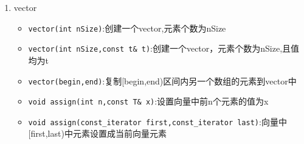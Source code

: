 \noindent

\begin{enumerate}
	\item vector
		\begin{itemize}
			\item \texttt{vector(int nSize)}:创建一个vector,元素个数为nSize
			\item \texttt{vector(int nSize,const t& t)}:创建一个vector，元素个数为nSize,且值均为t
			\item \texttt{vector(begin,end)}:复制[begin,end)区间内另一个数组的元素到vector中
			\item \texttt{void assign(int n,const T& x)}:设置向量中前n个元素的值为x
			\item \texttt{void assign(const_iterator first,const_iterator last)}:向量中[first,last)中元素设置成当前向量元素
		\end{itemize}
	

\end{enumerate}

